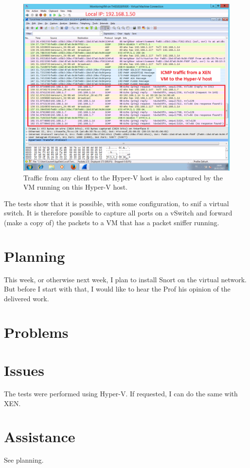 \documentclass[11pt, a4paper]{article}
\begin{document}
\clearpage
\begin{figure}[h]
    \centering
    \includegraphics[width=1\textwidth]{HyperV_12.png}
\caption{Traffic from any client to the Hyper-V host is also captured by the VM running on this Hyper-V host.}
\end{figure}
The tests show that it is possible, with some configuration, to snif a virtual switch. It is therefore possible to capture all ports on a vSwitch and forward (make a copy of) the packets to a VM that has a packet sniffer running.

\section*{Planning}
 
This week, or otherwise next week, I plan to install Snort on the virtual network. But before I start with that, I would like to hear the Prof his opinion of the delivered work.


\section*{Problems}



\section*{Issues}

The tests were performed using Hyper-V. If requested, I can do the same with XEN.


\section*{Assistance}

See planning.
\end{document}
